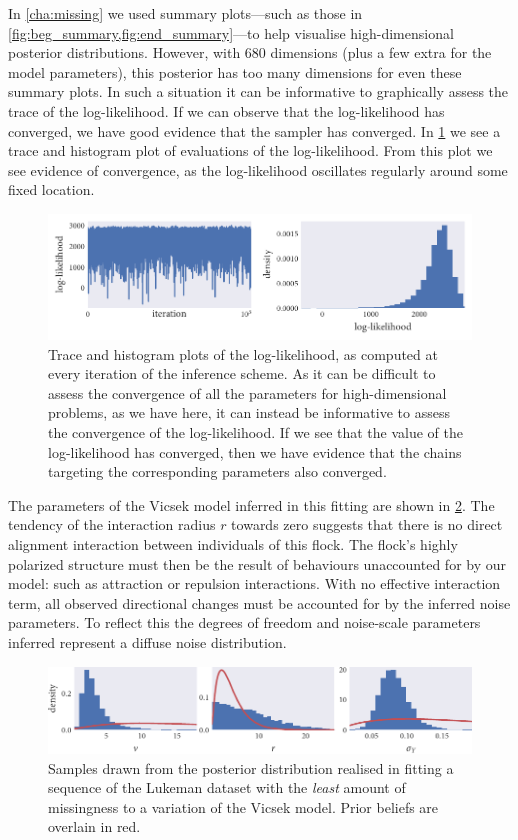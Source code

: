In \cref{cha:missing} we used summary plots---such as those in
\cref{fig:beg_summary,fig:end_summary}---to help visualise high-dimensional
posterior distributions. However, with $680$ dimensions (plus a few extra for
the model parameters), this posterior has too many dimensions for even these
summary plots. In such a situation it can be informative to graphically assess
the trace of the log-likelihood. If we can observe that the log-likelihood has
converged, we have good evidence that the sampler has converged. In
\cref{fig:log_ll} we see a trace and histogram plot of evaluations of the
log-likelihood. From this plot we see evidence of convergence, as the
log-likelihood oscillates regularly around some fixed location.

\begin{figure}[tb]
  \includegraphics{log_likelihood.pdf}
  \caption{Trace and histogram plots of the log-likelihood, as computed at
    every iteration of the inference scheme. As it can be difficult to assess
    the convergence of all the parameters for high-dimensional problems, as
    we have here, it can instead be informative to assess the convergence of
    the log-likelihood. If we see that the value of the log-likelihood has
    converged, then we have evidence that the chains targeting the corresponding
    parameters also converged.}
    \label{fig:log_ll}
\end{figure}

The parameters of the Vicsek model inferred in this fitting are shown in
\cref{fig:lukeman_params}. The tendency of the interaction radius $r$ towards
zero suggests that there is no direct alignment interaction between individuals
of this flock. The flock's highly polarized structure must then be the result
of behaviours unaccounted for by our model: such as attraction or repulsion
interactions. With no effective interaction term, all observed directional
changes must be accounted for by the inferred noise parameters. To reflect this
the degrees of freedom and noise-scale parameters inferred represent a diffuse
noise distribution.

\begin{figure}[tb]
  \includegraphics{params_hist.pdf}
  \caption{Samples drawn from the posterior distribution realised in fitting a
    sequence of the Lukeman dataset with the \emph{least} amount of missingness
    to a variation of the Vicsek model. Prior beliefs are overlain in red.}
  \label{fig:lukeman_params}
\end{figure}

